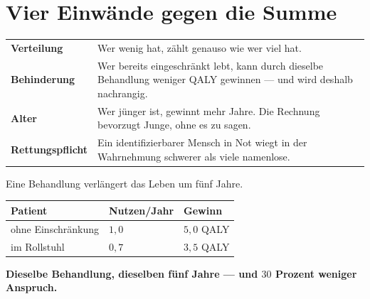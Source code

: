 \section{Vier Einwände gegen die Summe}

\begin{merksatz}
\begin{center}
{\small
\renewcommand{\arraystretch}{1.55}
\begin{tabular}{@{}P{2.6cm}P{6.0cm}@{}}
\toprule
\textbf{Verteilung} & Wer wenig hat, zählt genauso wie wer viel hat.\\
\textbf{Behinderung} & Wer bereits eingeschränkt lebt, kann durch dieselbe Behandlung weniger QALY gewinnen --- und wird deshalb nachrangig.\\
\textbf{Alter} & Wer jünger ist, gewinnt mehr Jahre. Die Rechnung bevorzugt Junge, ohne es zu sagen.\\
\textbf{Rettungspflicht} & Ein identifizierbarer Mensch in Not wiegt in der Wahrnehmung schwerer als viele namenlose.\\
\bottomrule
\end{tabular}}
\end{center}

Eine Behandlung verlängert das Leben um fünf Jahre.
\begin{center}
{\small
\renewcommand{\arraystretch}{1.48}
\begin{tabular}{@{}P{2.8cm}P{2.2cm}P{2.4cm}@{}}
\toprule
\textbf{Patient} & \textbf{Nutzen/Jahr} & \textbf{Gewinn}\\
\midrule
ohne Einschränkung & $1{,}0$ & $5{,}0$ QALY\\
im Rollstuhl & $0{,}7$ & $3{,}5$ QALY\\
\bottomrule
\end{tabular}}
\end{center}

\begin{center}
\begin{minipage}{0.9\textwidth}
\textbf{Dieselbe Behandlung, dieselben fünf Jahre --- und $30$ Prozent weniger Anspruch.}
\end{minipage}
\end{center}

\begin{center}
\begin{minipage}{0.88\textwidth}
\end{minipage}
\end{center}
\end{merksatz}


